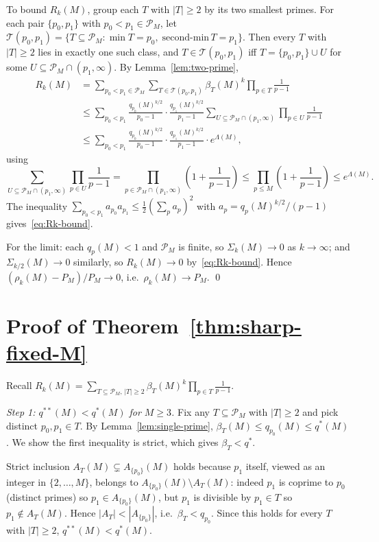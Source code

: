 \documentclass[11pt]{article}
\theoremstyle{remark}
\newcommand{\PM}{\mathcal{P}_M}
\begin{document}
To bound $R_k(M)$, group each $T$ with $|T| \geq 2$ by its two smallest primes. For each pair $\{p_0, p_1\}$ with $p_0 < p_1 \in \PM$, let $\mathcal{T}(p_0, p_1) = \{T \subseteq \PM : \min T = p_0,\; \text{second-min}\, T = p_1\}$. Then every $T$ with $|T| \geq 2$ lies in exactly one such class, and $T \in \mathcal{T}(p_0, p_1)$ iff $T = \{p_0, p_1\} \cup U$ for some $U \subseteq \PM \cap (p_1, \infty)$. By Lemma~\ref{lem:two-prime},
\begin{align*}
R_k(M) &= \sum_{p_0 < p_1 \in \PM} \sum_{T \in \mathcal{T}(p_0, p_1)} \beta_T(M)^k \prod_{p \in T} \frac{1}{p-1} \\
&\leq \sum_{p_0 < p_1} \frac{q_{p_0}(M)^{k/2}}{p_0 - 1}\cdot \frac{q_{p_1}(M)^{k/2}}{p_1 - 1} \sum_{U \subseteq \PM \cap (p_1, \infty)} \prod_{p \in U} \frac{1}{p-1} \\
&\leq \sum_{p_0 < p_1} \frac{q_{p_0}(M)^{k/2}}{p_0 - 1}\cdot \frac{q_{p_1}(M)^{k/2}}{p_1 - 1} \cdot e^{\Lambda(M)},
\end{align*}
using
\[
\sum_{U \subseteq \PM \cap (p_1,\infty)} \prod_{p \in U}\frac{1}{p-1}
= \prod_{p \in \PM \cap (p_1,\infty)}\left(1+\frac{1}{p-1}\right)
\leq \prod_{p \leq M}\left(1+\frac{1}{p-1}\right)
\leq e^{\Lambda(M)}.
\]
The inequality $\sum_{p_0 < p_1} a_{p_0} a_{p_1} \leq \tfrac12(\sum_p a_p)^2$ with $a_p = q_p(M)^{k/2}/(p-1)$ gives~\eqref{eq:Rk-bound}.

For the limit: each $q_p(M) < 1$ and $\PM$ is finite, so $\Sigma_k(M) \to 0$ as $k \to \infty$; and $\Sigma_{k/2}(M) \to 0$ similarly, so $R_k(M) \to 0$ by~\eqref{eq:Rk-bound}. Hence $(\rho_k(M) - P_M)/P_M \to 0$, i.e.\ $\rho_k(M) \to P_M$. \qed

\section{Proof of Theorem~\ref{thm:sharp-fixed-M}}\label{sec:thm-sharp-fixed-M}

Recall $R_k(M) = \sum_{T \subseteq \PM,\, |T| \geq 2}\beta_T(M)^k \prod_{p \in T}\frac{1}{p-1}$.

\emph{Step 1: $q^{**}(M) < q^{*}(M)$ for $M \geq 3$.} Fix any $T \subseteq \PM$ with $|T| \geq 2$ and pick distinct $p_0, p_1 \in T$. By Lemma~\ref{lem:single-prime}, $\beta_T(M) \leq q_{p_0}(M) \leq q^*(M)$. We show the first inequality is strict, which gives $\beta_T < q^*$.

Strict inclusion $A_T(M) \subsetneq A_{\{p_0\}}(M)$ holds because $p_1$ itself, viewed as an integer in $\{2, \ldots, M\}$, belongs to $A_{\{p_0\}}(M) \setminus A_T(M)$: indeed $p_1$ is coprime to $p_0$ (distinct primes) so $p_1 \in A_{\{p_0\}}(M)$, but $p_1$ is divisible by $p_1 \in T$ so $p_1 \notin A_T(M)$. Hence $|A_T| < |A_{\{p_0\}}|$, i.e.\ $\beta_T < q_{p_0}$. Since this holds for every $T$ with $|T| \geq 2$, $q^{**}(M) < q^*(M)$.
\end{document}
